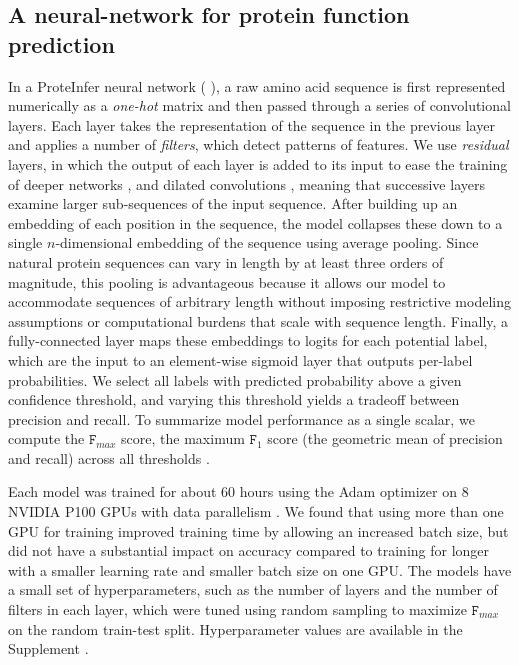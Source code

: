 \subsection*{A neural-network for protein function prediction}
In a ProteInfer neural network (%
), a raw amino acid sequence is first represented numerically as a \textit{one-hot} matrix and then passed through a series of convolutional layers. Each layer takes the representation of the sequence in the previous layer and applies a number of \textit{filters}, which detect patterns of features. We use \textit{residual} layers, in which the output of each layer is added to its input to ease the training of deeper networks \cite{resnet}, and dilated convolutions \cite{dilatedconvolutions}, meaning that successive layers examine larger sub-sequences of the input sequence. After building up an embedding of each position in the sequence, the model collapses these down to a single $n$-dimensional embedding of the sequence using average pooling. Since natural protein sequences can vary in length by at least three orders of magnitude, this pooling is advantageous because it allows our model to accommodate sequences of arbitrary length without imposing restrictive modeling assumptions or computational burdens that scale with sequence length. \DIFaddbegin {}\DIFaddend Finally, a fully-connected layer maps these embeddings to logits for each potential label, which are the input to an element-wise sigmoid layer that outputs per-label probabilities. 
We select all labels with predicted probability above a given confidence threshold, and varying this threshold yields a tradeoff between precision and recall. To summarize model performance as a single scalar, we compute the $\texttt{F}_{max}$ score, the maximum $\texttt{F}_{1}$ score (the geometric mean of precision and recall) across all thresholds \citep{radivojac2013large}.  

Each model was trained for about 60 hours using the Adam optimizer \citep{kingma2014adam} on 8 NVIDIA P100 GPUs with data parallelism \cite{dean2012large, dataparalellism}.  We found that using more than one GPU for training improved training time by allowing an increased batch size, but did not have a substantial impact on accuracy compared to training for longer with a smaller learning rate and smaller batch size on one GPU. The models have a small set of hyperparameters, such as the number of layers and the number of filters in each layer, which were tuned using random sampling to maximize $\texttt{F}_{max}$ on the random train-test split. Hyperparameter values are available in the \textnormal{ Supplement}%
.
